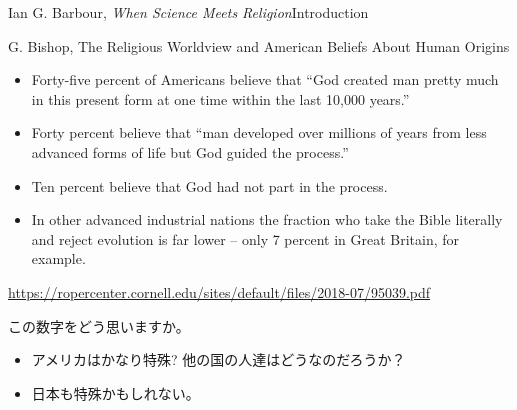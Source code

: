 \documentclass[10pt, dvipdfmx]{beamer}
\begin{document}
\begin{frame}{Ian G. Barbour, {\it When Science Meets Religion}}{Introduction}

\begin{block}{G. Bishop, The Religious Worldview and American Beliefs About Human Origins}
\begin{itemize}
\item Forty-five percent of Americans believe that ``God created man pretty much in this present form at one time within the last 10,000 years.''
\item Forty percent believe that ``man developed over millions of years from less advanced forms of life but God guided the process.''
\item Ten percent believe that God had not part in the process.
\item In other advanced industrial nations the fraction who take the Bible literally and reject evolution is far lower -- only 7 percent in Great Britain, for example.
\end{itemize}
\hfill {\small \url{https://ropercenter.cornell.edu/sites/default/files/2018-07/95039.pdf}}
\end{block}

\begin{alertblock}{この数字をどう思いますか。}
\begin{itemize}
\item アメリカはかなり特殊? 他の国の人達はどうなのだろうか？
\item 日本も特殊かもしれない。
\end{itemize}
\end{alertblock}


\end{frame}
\end{document}
